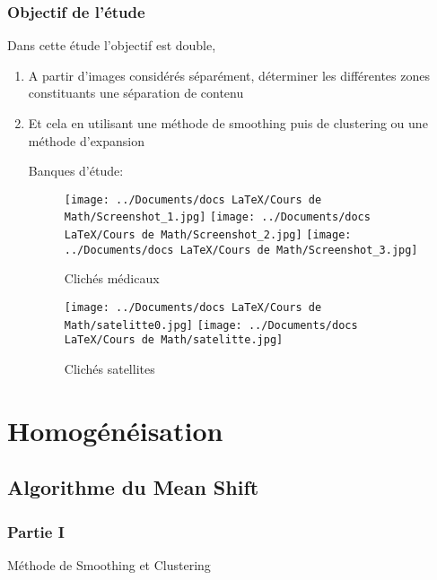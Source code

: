 \documentclass{beamer}
\begin{document}
\begin{frame}
\frametitle{Objectif de l'étude}

Dans cette étude l'objectif est double,

\begin{enumerate}
\item A partir d'images considérés séparément, déterminer les différentes zones constituants une séparation de contenu
\item Et cela en utilisant une méthode de smoothing puis de clustering ou une méthode d'expansion

Banques d'étude:
\begin{figure}[h]
    \begin{minipage}[c]{.55\linewidth}
        \centering
        \texttt{[image: ../Documents/docs LaTeX/Cours de Math/Screenshot\_1.jpg]}
        \texttt{[image: ../Documents/docs LaTeX/Cours de Math/Screenshot\_2.jpg]}
        \texttt{[image: ../Documents/docs LaTeX/Cours de Math/Screenshot\_3.jpg]}
        \caption{Clichés médicaux}
    \end{minipage}
	\begin{minipage}[c]{.39\linewidth}
        \centering
        \texttt{[image: ../Documents/docs LaTeX/Cours de Math/satelitte0.jpg]}
        \texttt{[image: ../Documents/docs LaTeX/Cours de Math/satelitte.jpg]}
        \caption{Clichés satellites}
	\end{minipage}
\end{figure}
\end{enumerate}
\end{frame}

\section{Homogénéisation}
\subsection{Algorithme du Mean Shift}

\begin{frame}
\frametitle{Partie I}
\begin{block}{}
\begin{center}
Méthode de Smoothing et Clustering
\end{center}
\end{block}
\end{frame}
\end{document}
